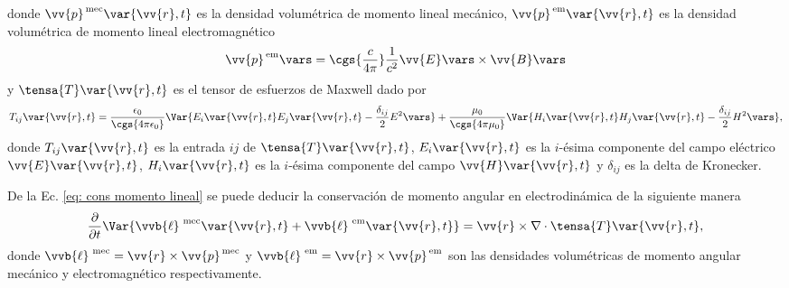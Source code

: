 donde $\vv{p}^{\rm \, mec}\var{\vv{r},t}$ es la densidad volumétrica de momento lineal mecánico, $\vv{p}^{\rm \, em}\var{\vv{r},t}$ es la densidad volumétrica de momento lineal electromagnético
\begin{equation}
\vv{p}^{\rm \, em}\vars = \cgs{\frac{c}{4\pi}}\frac{1}{c^2}\vv{E}\vars\times\vv{B}\vars
\end{equation}
y $\tensa{T}\var{\vv{r},t}$ es el tensor de esfuerzos de Maxwell dado por \cite{jackson}
\begin{equation}
T_{ij}\var{\vv{r},t}= \frac{\epsilon_0}{\cgs{4\pi\epsilon_0}} \Var{E_i\var{\vv{r},t}E_j\var{\vv{r},t} -\frac{\delta_{ij}}{2}E^2\vars} +  \frac{\mu_0}{\cgs{4\pi\mu_0}} \Var{ H_i\var{\vv{r},t}H_j\var{\vv{r},t} -\frac{\delta_{ij}}{2}H^2\vars } ,
\end{equation}
donde $T_{ij}\var{\vv{r},t}$ es la entrada $ij$ de $\tensa{T}\var{\vv{r},t}$, $E_i\var{\vv{r},t}$ es la $i$-ésima componente del campo eléctrico $\vv{E}\var{\vv{r},t}$, $H_i\var{\vv{r},t}$ es la $i$-ésima componente del campo $\vv{H}\var{\vv{r},t}$ y $\delta_{ij}$ es la delta de Kronecker. 

De la Ec. \eqref{eq: cons momento lineal} se puede deducir la conservación de momento angular en electrodinámica de la siguiente manera
\begin{equation}
\frac{\partial}{\partial t} \Var{\vvb{\ell}^{\rm \, \,mec}\var{\vv{r},t}+\vvb{\ell}^{\rm \, \,em}\var{\vv{r},t}} = \vv{r}\times\nabla \cdot \tensa{T}\var{\vv{r},t},
\label{Eq: r cross P}
\end{equation}
donde $\vvb{\ell}^{\rm \, \,mec}=\vv{r}\times\vv{p}^{\rm \,mec}$ y $\vvb{\ell}^{\rm \, \,em}=\vv{r}\times\vv{p}^{\rm \,em}$ son las densidades volumétricas de momento angular mecánico y electromagnético respectivamente.

